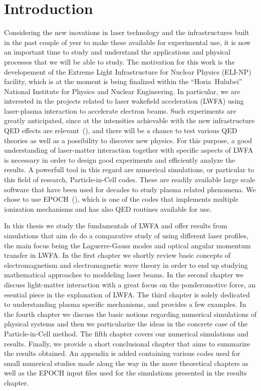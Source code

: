 \documentclass[12pt, class=report, crop=false]{standalone}
\begin{document}
\chapter*{Introduction}%
\label{chap:intro}

Considering the new inovations in laser technology and the infrastructures built in the past couple of yesr to make these available for experimental use, it is now an important time to study and understand the applications and physical processes that we will be able to study. The motivation for this work is the developement of the Extreme Light Infrastructure for Nuclear Physics (ELI-NP) facility, which is at the moment is being finalized within the ``Horia~Hulubei'' National Institute for Physics and Nuclear Engineering. In particular, we are interested in the projects related to laser wakefield acceleration (LWFA) using laser-plasma interaction to accelerate electron beams. Such experiments are greatly anticipated, since at the intensities achievable with the new infrastructure QED effects are relevant~(\cite{tanakaCurrentStatusHighlights2020}), and there will be a chance to test various QED theories as well as a possibility to discover new physics. For this purpose, a good understanding of laser-matter interaction together with specific aspects of LWFA is necessary in order to design good experiments and efficiently analyze the results. A powerfull tool in this regard are numerical simulations, or particular to this field of research, Particle-in-Cell codes. These are readily available large scale software that have been used for decades to study plasma related phenomena. We chose to use EPOCH~(\cite{arberContemporaryParticleincellApproach2015}), which is one of the codes that implements multiple ionization mechanisms and has also QED routines available for use.

In this thesis we study the fundamentals of LWFA and offer results from simulations that aim do do a comparative study of using different laser profiles, the main focus being the Laguerre-Gauss modes and optical angular momentum transfer in LWFA. In the first chapter we shortly review basic concepts of electromagnetism and electromagnetic wave theory in order to end up studying mathematical approaches to moddeling laser beams. In the second chapter we discuss light-matter interaction with a great focus on the ponderomotive force, an esential piece in the explanation of LWFA. The third chapter is solely dedicated to understanding plasma specific mechanisms, and provides a few examples. In the fourth chapter we discuss the basic notions regarding numerical simulations of physical systems and then we particularize the ideas in the concrete case of the Particle-in-Cell method. The fifth chapter covers our numerical simulations and results. Finally, we provide a short conclusional chapter that aims to summarize the results obtained. An appendix is added containing various codes used for small numerical studies made along the way in the more theoretical chapters as well as the EPOCH input files used for the simulations presented in the results chapter.
\end{document}
